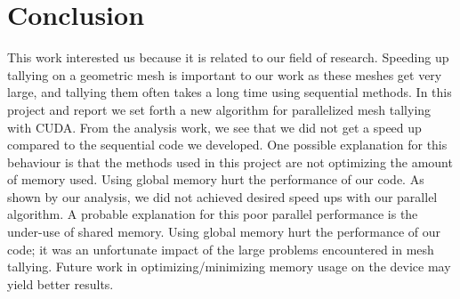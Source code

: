\section{Conclusion}
This work interested us because it is related to our field of 
research. Speeding up tallying on a geometric mesh is important to our work 
as these meshes get very large, and tallying them often takes a long time
using sequential methods. In this project and report we set
forth a new algorithm for parallelized mesh tallying with CUDA. 
From the analysis work, we see that we did not get a speed up compared 
to the sequential code we developed. One possible explanation for this 
behaviour is that the methods used in this project are not optimizing 
the amount of memory used. Using global memory hurt the performance of our code.
As shown by our analysis, we did not achieved desired speed ups with our
parallel algorithm. 
A probable explanation for this poor parallel performance is the under-use of
shared memory. Using global memory hurt the performance of our code;
it was an unfortunate impact of the large problems encountered in mesh tallying.
Future work in optimizing/minimizing memory usage on the device may yield
better results.
